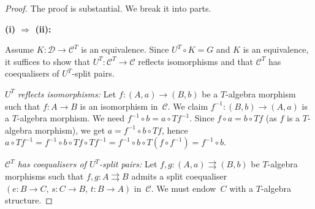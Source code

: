 \documentclass[a4paper,12pt]{book}
\theoremstyle{definition}
\theoremstyle{plain}
\theoremstyle{remark}
\begin{document}
\begin{proof}
The proof is substantial.  We break it into parts.

\medskip\noindent
\textbf{(i) $\Rightarrow$ (ii):}

Assume $K\colon\mathcal{D}\to\mathcal{C}^T$ is an equivalence.
Since $U^T\circ K = G$ and $K$ is an equivalence, it suffices to
show that $U^T\colon\mathcal{C}^T\to\mathcal{C}$ reflects isomorphisms
and that $\mathcal{C}^T$ has coequalisers of $U^T$-split pairs.

\emph{$U^T$ reflects isomorphisms:}
Let $f\colon(A,a)\to(B,b)$ be a $T$-algebra morphism such that
$f\colon A\to B$ is an isomorphism in~$\mathcal{C}$.
We claim $f^{-1}\colon(B,b)\to(A,a)$ is a $T$-algebra morphism.
We need $f^{-1}\circ b = a\circ Tf^{-1}$.  Since $f\circ a = b\circ Tf$
(as $f$ is a $T$-algebra morphism), we get
$a = f^{-1}\circ b\circ Tf$, hence
$a\circ Tf^{-1} = f^{-1}\circ b\circ Tf\circ Tf^{-1}
= f^{-1}\circ b\circ T(f\circ f^{-1}) = f^{-1}\circ b$.

\emph{$\mathcal{C}^T$ has coequalisers of $U^T$-split pairs:}
Let $f,g\colon(A,a)\rightrightarrows(B,b)$ be $T$-algebra morphisms
such that $f,g\colon A\rightrightarrows B$ admits a split coequaliser
$(e\colon B\to C,\, s\colon C\to B,\, t\colon B\to A)$ in~$\mathcal{C}$.
We must endow~$C$ with a $T$-algebra structure.


\end{proof}
\end{document}
